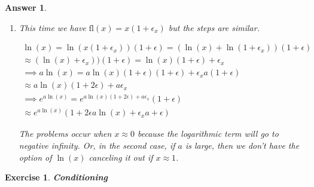 \documentclass[12pt]{article}
\theoremstyle{colon}
\newtheorem{exercise}{Exercise}
\newtheorem*{answer}{Answer}
\begin{document}
\begin{answer}
\begin{enumerate}[label=\alph*)]
\begin{enumerate}[label=\roman*)]
          \begin{gather*}
            \ln(x) = \ln(x)(1+\epsilon) \\
            \implies a \ln(x) = a \ln(x) (1+\epsilon)(1+\epsilon)(1+\epsilon_a) \\
            \approx a \ln(x) (1+2\epsilon+\epsilon_a) \\
            \implies e^{a \ln(x)} = e^{a \ln(x)(1+2\epsilon+\epsilon_a)}(1+\epsilon) \\
            \approx e^{a \ln(x)} (1+2\epsilon a \ln(x) +\epsilon_a a \ln(x)+\epsilon)
          \end{gather*}

        \item This time we have $\text{fl}(x) = x (1+\epsilon_x)$ but the steps are similar.

          \begin{gather*}
            \ln(x) = \ln(x(1+\epsilon_x))(1+\epsilon) = (\ln(x) +\ln(1+\epsilon_x))(1+\epsilon)\\
            \approx (\ln(x)+\epsilon_x))(1+\epsilon) = \ln(x)(1+\epsilon)+\epsilon_x \\
            \implies a \ln(x) = a \ln(x) (1+\epsilon)(1+\epsilon) + \epsilon_x a (1+\epsilon) \\
            \approx a \ln(x) (1+2\epsilon) + a \epsilon_x \\
            \implies e^{a \ln(x)} = e^{a \ln(x)(1+2\epsilon) + a \epsilon_x}(1+\epsilon) \\
            \approx e^{a \ln(x)} (1+2\epsilon a \ln(x) + \epsilon_x a +\epsilon)
          \end{gather*}

        The problems occur when $x \approx 0$ because the logarithmic term will go to negative infinity. Or, in the second case, if $a$ is large, then we don't have the option of $\ln(x)$ canceling it out if $x \approx 1$.
      \end{enumerate}
  \end{enumerate}
\end{answer}

\clearpage

\begin{exercise}
  \textbf{Conditioning}
\end{exercise}
\end{document}
